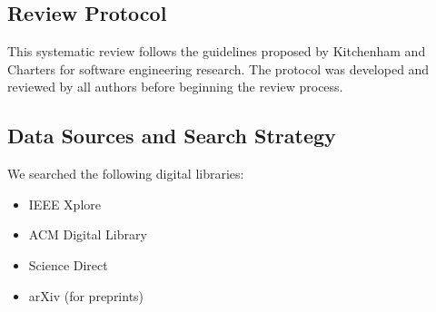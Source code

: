 



\subsection{Review Protocol}
This systematic review follows the guidelines proposed by Kitchenham and Charters for software engineering research. The protocol was developed and reviewed by all authors before beginning the review process.

\subsection{Data Sources and Search Strategy}
We searched the following digital libraries:
\begin{itemize}
    \item IEEE Xplore
    \item ACM Digital Library
    \item Science Direct
    \item arXiv (for preprints)
\end{itemize}


